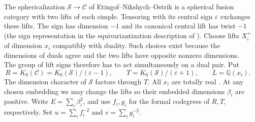 \documentclass[11pt,a4paper]{article}
\theoremstyle{definition}\newtheorem{definition}[theorem]{Definition}
\theoremstyle{remark}\newtheorem{remark}[theorem]{Remark}
\newcommand{\C}{\mathcal C}
\newcommand{\Q}{\mathbb Q}
\numberwithin{equation}{section}
\begin{document}
The sphericalization $\mathcal S\to\C$ of Etingof--Nikshych--Ostrik
\cite[Remark~3.1]{ENO} is a spherical fusion category with two lifts of
each simple. Tensoring with its central sign $\varepsilon$ exchanges
these lifts. The sign has dimension $-1$ and its canonical central
lift has twist $-1$ (the sign representation in the equivariantization
description of \cite[Section~5.3]{Bartlett}). Choose lifts $X_i^+$
of dimension $x_i$ compatibly with duality. Such choices exist because
the dimensions of duals agree and the two lifts have opposite nonzero
dimensions. The group of lift signs therefore has to act simultaneously
on a dual pair. Put
\[
 R=K_0(\C)=K_0(\mathcal S)/(\varepsilon-1),\qquad
 T=K_0(\mathcal S)/(\varepsilon+1),\qquad L=\Q(x_i).
\]
The dimension character of $\mathcal S$ factors through $T$.
All $x_i$ are totally real \cite[Corollary~2.10]{ENO}.
At any chosen embedding we may change the lifts so their
embedded dimensions $\beta_i$ are positive. Write $E=\sum_i\beta_i^2$,
and use $f_i,g_i$ for the formal codegrees of $R,T$, respectively.
Set $u=\sum_i f_i^{-2}$ and $v=\sum_i g_i^{-2}$.
\end{document}

